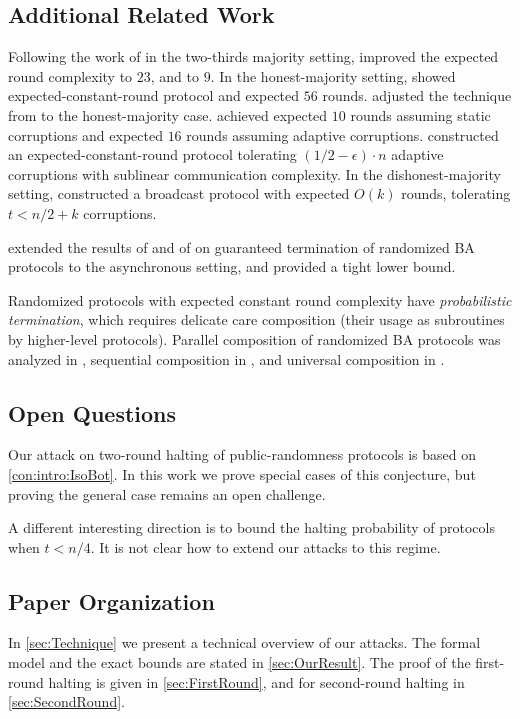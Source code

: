 \subsection{Additional Related Work}\label{sec:relatedWork}

Following the work of \citet{FM97} in the two-thirds majority setting, \citet{KK06} improved the expected round complexity to $23$, and \citet{Micali17} to $9$. In the honest-majority setting, \citet{FG03} showed expected-constant-round protocol and \citet{KK06} expected $56$ rounds. \citet{MV17} adjusted the technique from \cite{Micali17} to the honest-majority case. \citet{ADDNR19} achieved expected $10$ rounds assuming static corruptions and expected $16$ rounds assuming adaptive corruptions. \citet{ACDNPRS19} constructed an expected-constant-round protocol tolerating $(1/2-\epsilon)\cdot n$ adaptive corruptions with sublinear communication complexity. In the dishonest-majority setting, \citet{GKKO07} constructed a broadcast protocol with expected $O(k)$ rounds, tolerating $t<n/2+k$ corruptions.

\citet{AH10} extended the results of \citet{CMS89} and of \citet{KY86} on guaranteed termination of randomized BA protocols to the asynchronous setting, and provided a tight lower bound.

Randomized protocols with expected constant round complexity have \emph{probabilistic termination}, which requires delicate care \wrt composition (\ie their usage as subroutines by higher-level protocols). Parallel composition of randomized BA protocols was analyzed in \cite{Ben-Or83,FG03}, sequential composition in \cite{LLR06}, and universal composition in \cite{CCGZ16,CCGZ17}.

\subsection{Open Questions}\label{sec:OpenQuest}
Our attack on two-round halting of public-randomness protocols is based on \cref{con:intro:IsoBot}. In this work we prove special cases of this conjecture, but proving the general case remains an open challenge.

A different interesting direction is to bound the halting probability of protocols when $t<n/4$. It is not clear how to extend our attacks to this regime.

\subsection*{Paper Organization}

In \cref{sec:Technique} we present a technical overview of our attacks. The formal model and the exact bounds are stated in \cref{sec:OurResult}. The proof of the first-round halting is given in \cref{sec:FirstRound}, and for second-round halting in \cref{sec:SecondRound}.
